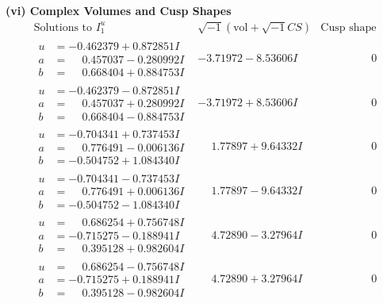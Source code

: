 \documentclass[1p]{elsarticle_modified}
\theoremstyle{definition}
\newcommand{\I}{\sqrt{-1}}
\begin{document}
\newpage\flushleft \textbf{(vi) Complex Volumes and Cusp Shapes}
$$\begin{array}{c|c|c}  
\text{Solutions to }I^u_{1}& \I (\text{vol} + \sqrt{-1}CS) & \text{Cusp shape}\\
 \hline 
\begin{aligned}
u &= -0.462379 + 0.872851 I \\
a &= \phantom{-}0.457037 - 0.280992 I \\
b &= \phantom{-}0.668404 + 0.884753 I\end{aligned}
 & -3.71972 - 8.53606 I & \phantom{-0.000000 } 0 \\ \hline\begin{aligned}
u &= -0.462379 - 0.872851 I \\
a &= \phantom{-}0.457037 + 0.280992 I \\
b &= \phantom{-}0.668404 - 0.884753 I\end{aligned}
 & -3.71972 + 8.53606 I & \phantom{-0.000000 } 0 \\ \hline\begin{aligned}
u &= -0.704341 + 0.737453 I \\
a &= \phantom{-}0.776491 - 0.006136 I \\
b &= -0.504752 + 1.084340 I\end{aligned}
 & \phantom{-}1.77897 + 9.64332 I & \phantom{-0.000000 } 0 \\ \hline\begin{aligned}
u &= -0.704341 - 0.737453 I \\
a &= \phantom{-}0.776491 + 0.006136 I \\
b &= -0.504752 - 1.084340 I\end{aligned}
 & \phantom{-}1.77897 - 9.64332 I & \phantom{-0.000000 } 0 \\ \hline\begin{aligned}
u &= \phantom{-}0.686254 + 0.756748 I \\
a &= -0.715275 - 0.188941 I \\
b &= \phantom{-}0.395128 + 0.982604 I\end{aligned}
 & \phantom{-}4.72890 - 3.27964 I & \phantom{-0.000000 } 0 \\ \hline\begin{aligned}
u &= \phantom{-}0.686254 - 0.756748 I \\
a &= -0.715275 + 0.188941 I \\
b &= \phantom{-}0.395128 - 0.982604 I\end{aligned}
 & \phantom{-}4.72890 + 3.27964 I & \phantom{-0.000000 } 0 \\ \hline\begin{aligned}

\end{aligned}
\end{array}$$
\end{document}
